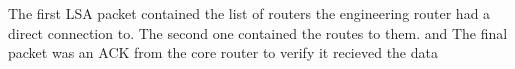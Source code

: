 \documentclass{article}
\begin{document}
		The first LSA packet contained the list of routers the engineering router had a direct connection to. The second one contained the routes to them. and The final packet was an ACK from the core router to verify it recieved the data
	
	
\end{document}
